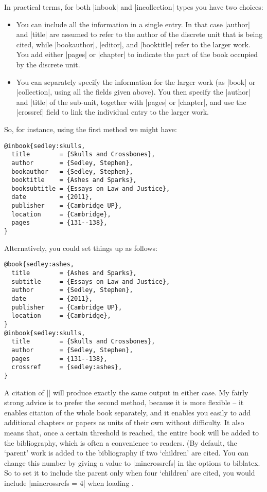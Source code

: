 In practical terms, for both |inbook| and |incollection| types you
have two choices:
\begin{itemize}
\item You can include all the information in a single entry. In that
  case |author| and |title| are assumed to refer to the author of the
  discrete unit that is being cited, while |bookauthor|, |editor|, and
  |booktitle| refer to the larger work. You add either |pages| or
  |chapter| to indicate the part of the book occupied by the discrete
  unit.
\item You can separately specify the information for the larger work
  (as |book| or |collection|, using all the fields given above). You
  then specify the |author| and |title| of the sub-unit, together with
  |pages| or |chapter|, and use the |crossref| field to link the
  individual entry to the larger work.
\end{itemize}

So, for instance, using the first method we might have:
\begin{Verbatim}
@inbook{sedley:skulls,
  title        = {Skulls and Crossbones},
  author       = {Sedley, Stephen},
  bookauthor   = {Sedley, Stephen},
  booktitle    = {Ashes and Sparks},
  booksubtitle = {Essays on Law and Justice},
  date         = {2011},
  publisher    = {Cambridge UP},
  location     = {Cambridge},
  pages        = {131--138},
}
\end{Verbatim}

Alternatively, you could set things up as follows:
\begin{Verbatim}
@book{sedley:ashes,
  title        = {Ashes and Sparks},
  subtitle     = {Essays on Law and Justice},
  author       = {Sedley, Stephen},
  date         = {2011},
  publisher    = {Cambridge UP},
  location     = {Cambridge},
}
@inbook{sedley:skulls,
  title        = {Skulls and Crossbones},
  author       = {Sedley, Stephen},
  pages        = {131--138},
  crossref     = {sedley:ashes},
}
\end{Verbatim}

A citation of |\cite{sedley:ashes}| will produce exactly the same
output in either case. My fairly strong advice is to prefer the second
method, because it is more flexible -- it enables citation of the
whole book separately, and it enables you easily to add additional
chapters or papers as units of their own without difficulty. It also
means that, once a certain threshold is reached, the entire book will
be added to the bibliography, which is often a convenience to
readers. (By default, the `parent' work is added to the bibliography
if two `children' are cited. You can change this number by giving a
value to |mincrossrefs| in the options to biblatex. So to set it to
include the parent only when four `children' are cited, you would
include |mincrossrefs = 4| when loading \biblatex.

